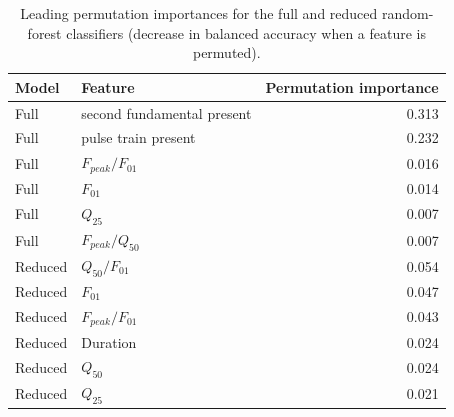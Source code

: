 \begin{table}[H]
\centering
\caption{Leading permutation importances for the full and reduced random-forest classifiers (decrease in balanced accuracy when a feature is permuted).}
\label{tab:p1imp}
\small
\begin{tabular}{llr}
\toprule
Model & Feature & Permutation importance \\
\midrule
Full & second fundamental present & 0.313 \\
Full & pulse train present & 0.232 \\
Full & $F_{peak}/F_{01}$ & 0.016 \\
Full & $F_{01}$ & 0.014 \\
Full & $Q_{25}$ & 0.007 \\
Full & $F_{peak}/Q_{50}$ & 0.007 \\
Reduced & $Q_{50}/F_{01}$ & 0.054 \\
Reduced & $F_{01}$ & 0.047 \\
Reduced & $F_{peak}/F_{01}$ & 0.043 \\
Reduced & Duration & 0.024 \\
Reduced & $Q_{50}$ & 0.024 \\
Reduced & $Q_{25}$ & 0.021 \\
\bottomrule
\end{tabular}
\end{table}